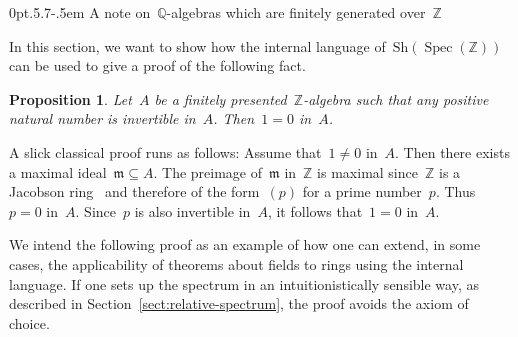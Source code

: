 \documentclass[10pt,reqno,a4paper]{amsbook}
\makeatletter
\theoremstyle{definition}
\theoremstyle{plain}
\newtheorem{prop}[defn]{Proposition}
\theoremstyle{remark}
\newcommand{\ZZ}{\mathbb{Z}}
\newcommand{\QQ}{\mathbb{Q}}
\newcommand{\mmm}{\mathfrak{m}}
\newcommand{\Sh}{\mathrm{Sh}}
\DeclareMathOperator{\Spec}{Spec}
\newcommand{\?}{\,{:}\,}
\renewcommand{\_}{\mathpunct{.}\,}
\newcommand{\stacksproject}[1]{\cite[{\href{http://stacks.math.columbia.edu/tag/#1}{Tag~#1}}]{stacks-project}}
\def\subsection{\@startsection{subsection}{2}%
  {0pt}{.5\linespacing\@plus.7\linespacing}{-.5em}%
  {\normalfont\bfseries}}
\makeatother
\begin{document}
\subsection{\texorpdfstring{A note on~$\QQ$-algebras which are finitely
generated over~$\ZZ$}{A note on~ℚ-algebras which are finitely generated
over~ℤ}}

In this section, we want to show how the internal language of~$\Sh(\Spec(\ZZ))$
can be used to give a proof of the following fact.

\begin{prop}\label{prop:fingen-algebra-q}
Let~$A$ be a finitely presented~$\ZZ$-algebra such that any positive natural
number is invertible in~$A$. Then~$1 = 0$ in~$A$.
\end{prop}

A slick classical proof runs as follows: Assume that~$1 \neq 0$ in~$A$. Then
there exists a maximal ideal~$\mmm \subseteq A$. The preimage of~$\mmm$
in~$\ZZ$ is maximal since~$\ZZ$ is a Jacobson ring~\stacksproject{00GB} and
therefore of the form~$(p)$ for a prime number~$p$. Thus~$p = 0$ in~$A$.
Since~$p$ is also invertible in~$A$, it follows that~$1 = 0$ in~$A$.

We intend the following proof as an example of how one can extend, in some
cases, the applicability of theorems about fields to rings using the internal
language. If one sets up the spectrum in an intuitionistically sensible way, as
described in Section~\ref{sect:relative-spectrum}, the proof avoids the axiom
of choice.
\end{document}
